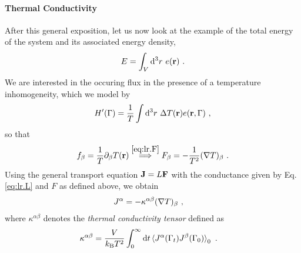 \paragraph{Thermal Conductivity}
After this general exposition, let us now look at the example of the total energy of the system and its associated energy density,
\begin{align}
	E = \int_V {\rm d}^3 r ~ e({\bf r})~.
	\label{eq:lr.E}
\end{align}
We are interested in the occuring flux in the presence of a temperature inhomogeneity, which we model by
\begin{align}
	H' (\Gamma) = \frac{1}{T} \int {\rm d}^3 r ~ \Delta T ({\bf r}) e({\bf r}, \Gamma)~,
	\label{eq:lr.Hp.temp}
\end{align}
so that
\begin{align}
	f_\beta = \frac{1}{T} \partial_\beta T ({\bf r}) 
		\stackrel{\eqref{eq:lr.F}}{\implies}
	F_\beta = - \frac{1}{T^2} ({\bf \nabla} T)_\beta ~.
	\label{eq:lr.F.temp}
\end{align}
Using the general transport equation ${\bf J} = L {\bf F}$ with the conductance given by Eq.\,\eqref{eq:lr.L} and $F$ as defined above, we obtain
\begin{align}
	J^\alpha 
		&= - \kappa^{\alpha \beta} ({\bf \nabla} T)_\beta~,
	\label{eq:lr.J.2}
\end{align}
where $\kappa^{\alpha \beta}$ denotes the \emph{thermal conductivity tensor} defined as
\begin{align}
	\kappa^{\alpha \beta}
		&=
		\frac{V}{k_{\rm B} T^2} \int_{0}^{\infty} 
		{\rm d} t \braket{J^\alpha (\Gamma_t) J^\beta (\Gamma_{0})}_0 ~.
	\label{eq:GreenKubo}
\end{align}

